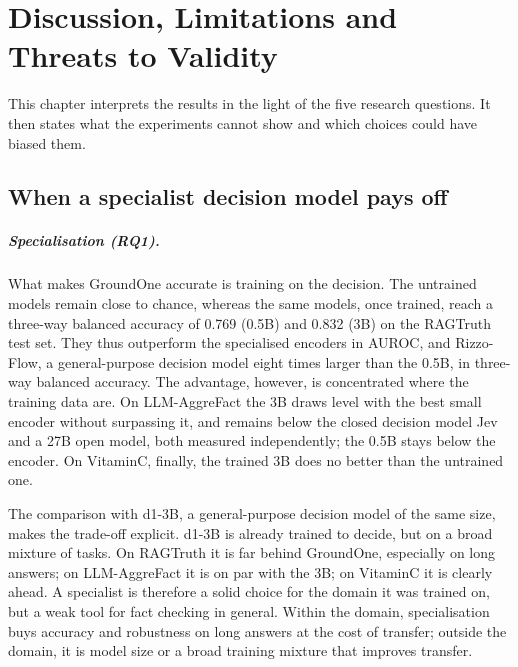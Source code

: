 \chapter{Discussion, Limitations and Threats to Validity}
\label{sec:discussion}


This chapter interprets the results in the light of the five research questions. It then states what the experiments
cannot show and which choices could have biased them.

\section{When a specialist decision model pays off}
\label{sec:disc-synthesis}

\paragraph{Specialisation (RQ1).} What makes GroundOne accurate is training on the decision. The untrained models remain
close to chance, whereas the same models, once trained, reach a three-way balanced accuracy of 0.769 (0.5B) and 0.832
(3B) on the RAGTruth test set. They thus outperform the specialised encoders in AUROC, and Rizzo-Flow, a general-purpose
decision model eight times larger than the 0.5B, in three-way balanced accuracy. The advantage, however, is concentrated
where the training data are. On LLM-AggreFact the 3B draws level with the best small encoder without surpassing it, and
remains below the closed decision model Jev and a 27B open model, both measured independently; the 0.5B stays below the
encoder. On VitaminC, finally, the trained 3B does no better than the untrained one.

The comparison with d1-3B, a general-purpose decision model of the same size, makes the trade-off explicit. d1-3B is
already trained to decide, but on a broad mixture of tasks. On RAGTruth it is far behind GroundOne, especially on long
answers; on LLM-AggreFact it is on par with the 3B; on VitaminC it is clearly ahead. A specialist is therefore a solid
choice for the domain it was trained on, but a weak tool for fact checking in general. Within the domain, specialisation
buys accuracy and robustness on long answers at the cost of transfer; outside the domain, it is model size or a broad
training mixture that improves transfer.

